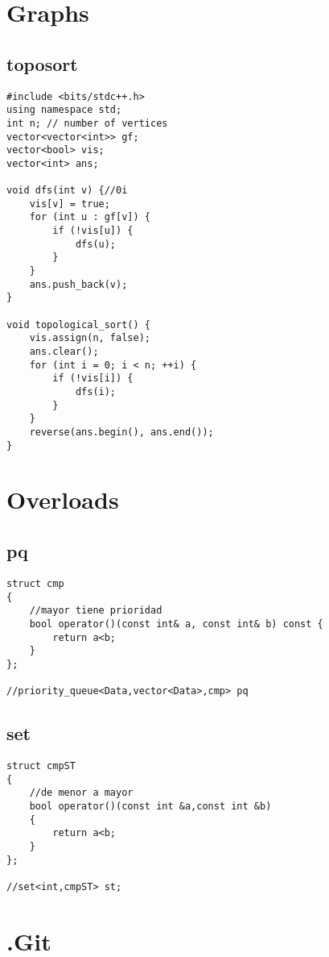 \section*{Graphs}

\subsection*{toposort}
\begin{lstlisting}
#include <bits/stdc++.h>
using namespace std;
int n; // number of vertices
vector<vector<int>> gf;
vector<bool> vis;
vector<int> ans;

void dfs(int v) {//0i
    vis[v] = true;
    for (int u : gf[v]) {
        if (!vis[u]) {
            dfs(u);
        }
    }
    ans.push_back(v);
}

void topological_sort() {
    vis.assign(n, false);
    ans.clear();
    for (int i = 0; i < n; ++i) {
        if (!vis[i]) {
            dfs(i);
        }
    }
    reverse(ans.begin(), ans.end());
}\end{lstlisting}

\section*{Overloads}

\subsection*{pq}
\begin{lstlisting}
struct cmp
{
    //mayor tiene prioridad
    bool operator()(const int& a, const int& b) const {
        return a<b;        
    }
};

//priority_queue<Data,vector<Data>,cmp> pq
\end{lstlisting}

\subsection*{set}
\begin{lstlisting}
struct cmpST
{
    //de menor a mayor
    bool operator()(const int &a,const int &b)
    {
        return a<b;
    }
};

//set<int,cmpST> st;
\end{lstlisting}

\section*{.Git}

